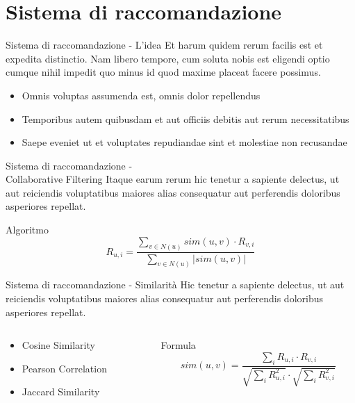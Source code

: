 \documentclass{beamer}
\begin{document}
	\section{Sistema di raccomandazione}

	\begin{frame}{Sistema di raccomandazione - L'idea}
		Et harum quidem rerum facilis est et expedita distinctio. Nam libero tempore, cum soluta nobis est eligendi optio cumque nihil impedit quo minus id quod maxime placeat facere possimus.

		\begin{itemize}
			\item Omnis voluptas assumenda est, omnis dolor repellendus
			\item Temporibus autem quibusdam et aut officiis debitis aut rerum necessitatibus
			\item Saepe eveniet ut et voluptates repudiandae sint et molestiae non recusandae
		\end{itemize}
	\end{frame}

	\begin{frame}{Sistema di raccomandazione -\\ Collaborative Filtering}
		Itaque earum rerum hic tenetur a sapiente delectus, ut aut reiciendis voluptatibus maiores alias consequatur aut perferendis doloribus asperiores repellat.

		\begin{block}{Algoritmo}
			$$ R_{u,i} = \frac{\sum_{v \in N(u)} sim(u,v) \cdot R_{v,i}}{\sum_{v \in N(u)} |sim(u,v)|} $$
		\end{block}
	\end{frame}

	\begin{frame}{Sistema di raccomandazione - Similarità}
		Hic tenetur a sapiente delectus, ut aut reiciendis voluptatibus maiores alias consequatur aut perferendis doloribus asperiores repellat.

		\begin{columns}
			\begin{column}{0.6\textwidth}
				\begin{itemize}
					\item Cosine Similarity
					\item Pearson Correlation
					\item Jaccard Similarity
				\end{itemize}
			\end{column}
			\begin{column}{0.4\textwidth}
				\begin{exampleblock}{Formula}
					$$ sim(u,v) = \frac{\sum_{i} R_{u,i} \cdot R_{v,i}}{\sqrt{\sum_{i} R_{u,i}^2} \cdot \sqrt{\sum_{i} R_{v,i}^2}} $$
				\end{exampleblock}
			\end{column}
		\end{columns}
	\end{frame}
\end{document}
